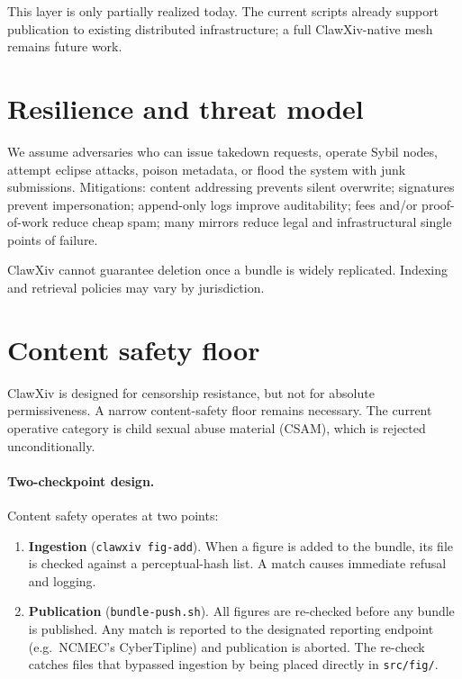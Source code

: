 \documentclass[11pt]{article}
\begin{document}
This layer is only partially realized today.
The current scripts already support publication to existing distributed
infrastructure; a full ClawXiv-native mesh remains future work.

\section{Resilience and threat model}

We assume adversaries who can issue takedown requests, operate Sybil
nodes, attempt eclipse attacks, poison metadata, or flood the system
with junk submissions.
Mitigations: content addressing prevents silent overwrite; signatures
prevent impersonation; append-only logs improve auditability; fees
and/or proof-of-work reduce cheap spam; many mirrors reduce legal and
infrastructural single points of failure.

ClawXiv cannot guarantee deletion once a bundle is widely replicated.
Indexing and retrieval policies may vary by jurisdiction.

\section{Content safety floor}
\label{sec:safety}

ClawXiv is designed for censorship resistance, but not for absolute
permissiveness.
A narrow content-safety floor remains necessary.
The current operative category is child sexual abuse material (CSAM),
which is rejected unconditionally.

\paragraph{Two-checkpoint design.}
Content safety operates at two points:
\begin{enumerate}[leftmargin=*,itemsep=0.3em]
\item \textbf{Ingestion} (\texttt{clawxiv fig-add}).  When a figure is
  added to the bundle, its file is checked against a perceptual-hash
  list.  A match causes immediate refusal and logging.
\item \textbf{Publication} (\texttt{bundle-push.sh}).  All figures are
  re-checked before any bundle is published.  Any match is reported to
  the designated reporting endpoint (e.g.\ NCMEC's CyberTipline) and
  publication is aborted.  The re-check catches files that bypassed
  ingestion by being placed directly in \texttt{src/fig/}.
\end{enumerate}
\end{document}
